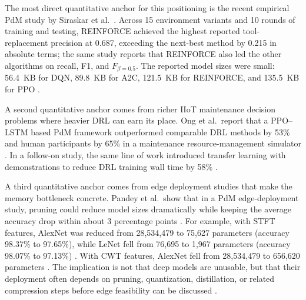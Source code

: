 \documentclass[sn-basic]{sn-jnl} %
\begin{document}
The most direct quantitative anchor for this positioning is the recent empirical PdM study by Siraskar et al.~\cite{Siraskar2025}. Across 15 environment variants and 10 rounds of training and testing, REINFORCE achieved the highest reported tool-replacement precision at 0.687, exceeding the next-best method by 0.215 in absolute terms; the same study reports that REINFORCE also led the other algorithms on recall, F1, and $F_{\beta=0.5}$. The reported model sizes were small: 56.4~KB for DQN, 89.8~KB for A2C, 121.5~KB for REINFORCE, and 135.5~KB for PPO \cite{Siraskar2025}.

A second quantitative anchor comes from richer IIoT maintenance decision problems where heavier DRL can earn its place. Ong et al.~report that a PPO--LSTM based PdM framework outperformed comparable DRL methods by 53\% and human participants by 65\% in a maintenance resource-management simulator \cite{Ong2022-01}. In a follow-on study, the same line of work introduced transfer learning with demonstrations to reduce DRL training wall time by 58\% \cite{Ong2022-02}.

A third quantitative anchor comes from edge deployment studies that make the memory bottleneck concrete. Pandey et al.~show that in a PdM edge-deployment study, pruning could reduce model sizes dramatically while keeping the average accuracy drop within about 3 percentage points \cite{Pandey2023}. For example, with STFT features, AlexNet was reduced from 28,534,479 to 75,627 parameters (accuracy 98.37\% to 97.65\%), while LeNet fell from 76,695 to 1,967 parameters (accuracy 98.07\% to 97.13\%) \cite{Pandey2023}. With CWT features, AlexNet fell from 28,534,479 to 656,620 parameters \cite{Pandey2023}. The implication is not that deep models are unusable, but that their deployment often depends on pruning, quantization, distillation, or related compression steps before edge feasibility can be discussed \cite{Pandey2023, Jang2020, Xu2022}.
\end{document}
